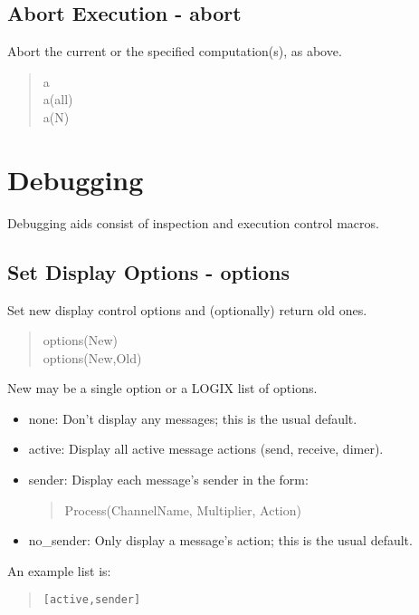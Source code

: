 \subsection{Abort Execution - abort}

Abort the current or the specified computation(s), as above.

\begin{verse}
    a \\
    a(all) \\
    a(N)
\end{verse}


\section{Debugging}

Debugging aids consist of inspection and execution control macros.

\subsection{Set Display Options - options}
\label{options}

Set new display control options and (optionally) return old ones.

\begin{verse}
    options(New) \\
    options(New,Old)
\end{verse}

\noindent
New  may be a single option or a LOGIX list of options.

\begin{itemize}
\item none:     Don't display any messages; this is the usual default.
\item active:   Display all active message actions (send, receive, dimer).
\item sender:   Display each message's sender in the form:
\begin{verse}
Process(ChannelName, Multiplier, Action)
\end{verse}
\item no\_sender: Only display a message's action; this is the usual default.
\end{itemize}

\noindent
An example list is:

\begin{verse}
    \verb+[active,sender]+
\end{verse}


